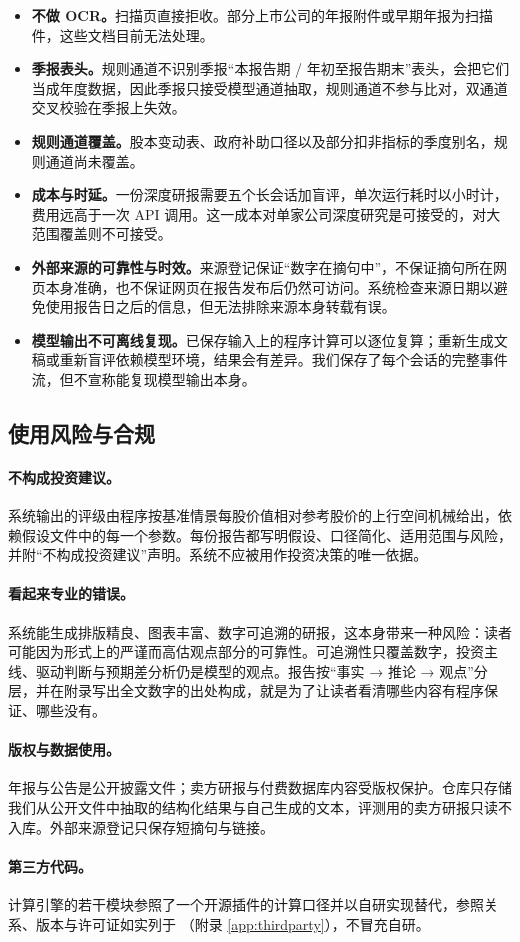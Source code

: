 \begin{itemize}
  \item \textbf{不做 OCR。}扫描页直接拒收。部分上市公司的年报附件或早期年报为扫描件，这些文档目前无法处理。
  \item \textbf{季报表头。}规则通道不识别季报“本报告期 / 年初至报告期末”表头，会把它们当成年度数据，因此季报只接受模型通道抽取，规则通道不参与比对，双通道交叉校验在季报上失效。
  \item \textbf{规则通道覆盖。}股本变动表、政府补助口径以及部分扣非指标的季度别名，规则通道尚未覆盖。
  \item \textbf{成本与时延。}一份深度研报需要五个长会话加盲评，单次运行耗时以小时计，费用远高于一次 API 调用。这一成本对单家公司深度研究是可接受的，对大范围覆盖则不可接受。
  \item \textbf{外部来源的可靠性与时效。}来源登记保证“数字在摘句中”，不保证摘句所在网页本身准确，也不保证网页在报告发布后仍然可访问。系统检查来源日期以避免使用报告日之后的信息，但无法排除来源本身转载有误。
  \item \textbf{模型输出不可离线复现。}已保存输入上的程序计算可以逐位复算；重新生成文稿或重新盲评依赖模型环境，结果会有差异。我们保存了每个会话的完整事件流，但不宣称能复现模型输出本身。
\end{itemize}

\subsection{使用风险与合规}

\paragraph{不构成投资建议。}系统输出的评级由程序按基准情景每股价值相对参考股价的上行空间机械给出，依赖假设文件中的每一个参数。每份报告都写明假设、口径简化、适用范围与风险，并附“不构成投资建议”声明。系统不应被用作投资决策的唯一依据。

\paragraph{看起来专业的错误。}系统能生成排版精良、图表丰富、数字可追溯的研报，这本身带来一种风险：读者可能因为形式上的严谨而高估观点部分的可靠性。可追溯性只覆盖数字，投资主线、驱动判断与预期差分析仍是模型的观点。报告按“事实 → 推论 → 观点”分层，并在附录写出全文数字的出处构成，就是为了让读者看清哪些内容有程序保证、哪些没有。

\paragraph{版权与数据使用。}年报与公告是公开披露文件；卖方研报与付费数据库内容受版权保护。仓库只存储我们从公开文件中抽取的结构化结果与自己生成的文本，评测用的卖方研报只读不入库。外部来源登记只保存短摘句与链接。

\paragraph{第三方代码。}计算引擎的若干模块参照了一个开源插件的计算口径并以自研实现替代，参照关系、版本与许可证如实列于 （附录 \ref{app:thirdparty}），不冒充自研。
